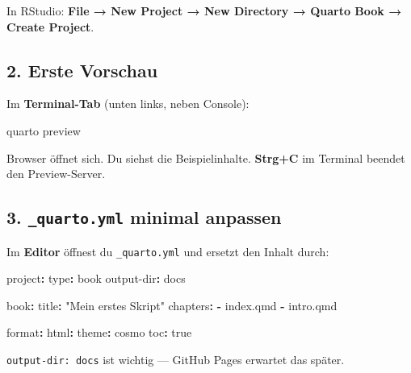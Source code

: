 \documentclass[
  ngerman,
  a4paper,
  DIV=11]{scrreprt}
\newenvironment{Shaded}{\begin{snugshade}}{\end{snugshade}}
\newcommand{\AttributeTok}[1]{\textcolor[rgb]{0.40,0.45,0.13}{#1}}
\newcommand{\CharTok}[1]{\textcolor[rgb]{0.13,0.47,0.30}{#1}}
\newcommand{\ExtensionTok}[1]{\textcolor[rgb]{0.00,0.23,0.31}{#1}}
\newcommand{\FunctionTok}[1]{\textcolor[rgb]{0.28,0.35,0.67}{#1}}
\newcommand{\KeywordTok}[1]{\textcolor[rgb]{0.00,0.23,0.31}{\textbf{#1}}}
\newcommand{\NormalTok}[1]{\textcolor[rgb]{0.00,0.23,0.31}{#1}}
\newcommand{\StringTok}[1]{\textcolor[rgb]{0.13,0.47,0.30}{#1}}
\begin{document}
In RStudio: \textbf{File → New Project → New Directory → Quarto Book →
Create Project}.

\subsection{2. Erste Vorschau}\label{erste-vorschau}

Im \textbf{Terminal-Tab} (unten links, neben Console):

\begin{Shaded}
\begin{Highlighting}[]
\ExtensionTok{quarto}\NormalTok{ preview}
\end{Highlighting}
\end{Shaded}

Browser öffnet sich. Du siehst die Beispielinhalte. \textbf{Strg+C} im
Terminal beendet den Preview-Server.

\subsection{\texorpdfstring{3. \texttt{\_quarto.yml} minimal
anpassen}{3. \_quarto.yml minimal anpassen}}\label{quarto.yml-minimal-anpassen}

Im \textbf{Editor} öffnest du \texttt{\_quarto.yml} und ersetzt den
Inhalt durch:

\begin{Shaded}
\begin{Highlighting}[]
\FunctionTok{project}\KeywordTok{:}
\AttributeTok{  }\FunctionTok{type}\KeywordTok{:}\AttributeTok{ book}
\AttributeTok{  }\FunctionTok{output{-}dir}\KeywordTok{:}\AttributeTok{ docs}

\FunctionTok{book}\KeywordTok{:}
\AttributeTok{  }\FunctionTok{title}\KeywordTok{:}\AttributeTok{ }\StringTok{"Mein erstes Skript"}
\AttributeTok{  }\FunctionTok{chapters}\KeywordTok{:}
\AttributeTok{    }\KeywordTok{{-}}\AttributeTok{ index.qmd}
\AttributeTok{    }\KeywordTok{{-}}\AttributeTok{ intro.qmd}

\FunctionTok{format}\KeywordTok{:}
\AttributeTok{  }\FunctionTok{html}\KeywordTok{:}
\AttributeTok{    }\FunctionTok{theme}\KeywordTok{:}\AttributeTok{ cosmo}
\AttributeTok{    }\FunctionTok{toc}\KeywordTok{:}\AttributeTok{ }\CharTok{true}
\end{Highlighting}
\end{Shaded}

\texttt{output-dir:\ docs} ist wichtig --- GitHub Pages erwartet das
später.
\end{document}
